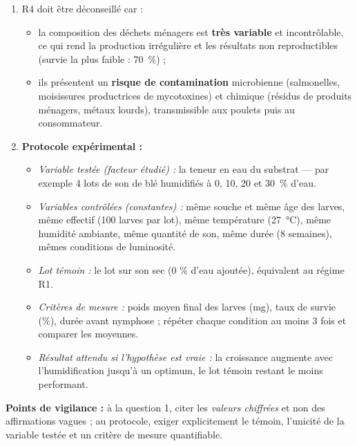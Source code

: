 \documentclass[11pt]{article}
\begin{document}
\begin{corrige}
\begin{enumerate}
\item R4 doit être déconseillé car :
\begin{itemize}
\item la composition des déchets ménagers est \textbf{très variable} et incontrôlable, ce qui rend la production irrégulière et les résultats non reproductibles (survie la plus faible : \SI{70}{\percent}) ;
\item ils présentent un \textbf{risque de contamination} microbienne (salmonelles, moisissures productrices de mycotoxines) et chimique (résidus de produits ménagers, métaux lourds), transmissible aux poulets puis au consommateur.
\end{itemize}
\item \textbf{Protocole expérimental :}
\begin{itemize}
\item \emph{Variable testée (facteur étudié) :} la teneur en eau du substrat — par exemple 4 lots de son de blé humidifiés à 0, 10, 20 et \SI{30}{\percent} d'eau.
\item \emph{Variables contrôlées (constantes) :} même souche et même âge des larves, même effectif (100 larves par lot), même température (\SI{27}{\celsius}), même humidité ambiante, même quantité de son, même durée (8 semaines), mêmes conditions de luminosité.
\item \emph{Lot témoin :} le lot sur son sec (0 \% d'eau ajoutée), équivalent au régime R1.
\item \emph{Critères de mesure :} poids moyen final des larves (mg), taux de survie (\%), durée avant nymphose ; répéter chaque condition au moins 3 fois et comparer les moyennes.
\item \emph{Résultat attendu si l'hypothèse est vraie :} la croissance augmente avec l'humidification jusqu'à un optimum, le lot témoin restant le moins performant.
\end{itemize}
\end{enumerate}
\textbf{Points de vigilance :} à la question 1, citer les \emph{valeurs chiffrées} et non des affirmations vagues ; au protocole, exiger explicitement le témoin, l'unicité de la variable testée et un critère de mesure quantifiable.
\end{corrige}
\end{document}
